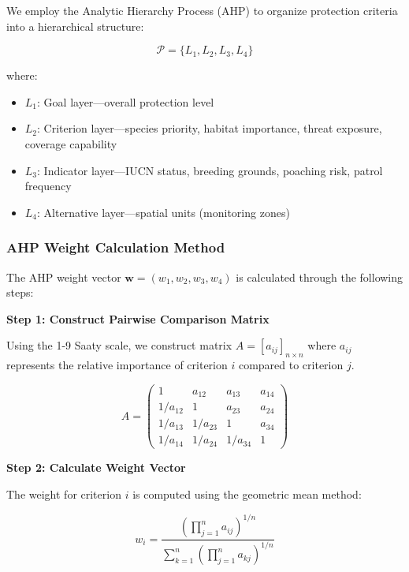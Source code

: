 We employ the Analytic Hierarchy Process (AHP) to organize protection criteria into a hierarchical structure:

\begin{equation}
\mathcal{P} = \{L_1, L_2, L_3, L_4\}
\end{equation}

where:
\begin{itemize}
\item $L_1$: Goal layer—overall protection level
\item $L_2$: Criterion layer—species priority, habitat importance, threat exposure, coverage capability
\item $L_3$: Indicator layer—IUCN status, breeding grounds, poaching risk, patrol frequency
\item $L_4$: Alternative layer—spatial units (monitoring zones)
\end{itemize}

\subsubsection{AHP Weight Calculation Method}

The AHP weight vector $\mathbf{w} = (w_1, w_2, w_3, w_4)$ is calculated through the following steps:

\textbf{Step 1: Construct Pairwise Comparison Matrix}

Using the 1-9 Saaty scale, we construct matrix $A = [a_{ij}]_{n \times n}$ where $a_{ij}$ represents the relative importance of criterion $i$ compared to criterion $j$.

\begin{equation}
A = \begin{pmatrix}
1 & a_{12} & a_{13} & a_{14} \\
1/a_{12} & 1 & a_{23} & a_{24} \\
1/a_{13} & 1/a_{23} & 1 & a_{34} \\
1/a_{14} & 1/a_{24} & 1/a_{34} & 1
\end{pmatrix}
\label{eq:pairwise_matrix}
\end{equation}

\textbf{Step 2: Calculate Weight Vector}

The weight for criterion $i$ is computed using the geometric mean method:

\begin{equation}
w_i = \frac{(\prod_{j=1}^{n} a_{ij})^{1/n}}{\sum_{k=1}^{n} (\prod_{j=1}^{n} a_{kj})^{1/n}}
\label{eq:ahp_weight}
\end{equation}

